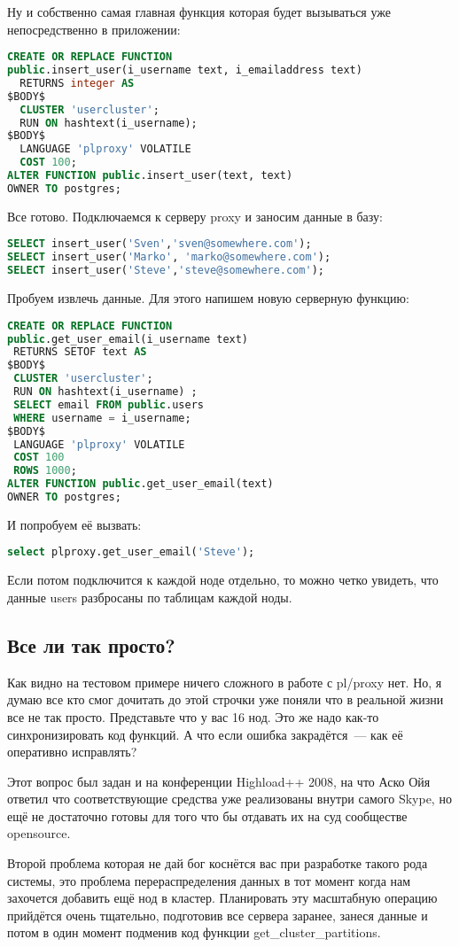 Ну и собственно самая главная функция которая будет вызываться уже непосредственно в приложении:
\begin{lstlisting}[language=SQL,label=lst:plproxy10,caption=Настройка]
CREATE OR REPLACE FUNCTION 
public.insert_user(i_username text, i_emailaddress text)
  RETURNS integer AS
$BODY$
  CLUSTER 'usercluster';
  RUN ON hashtext(i_username);
$BODY$
  LANGUAGE 'plproxy' VOLATILE
  COST 100;
ALTER FUNCTION public.insert_user(text, text) 
OWNER TO postgres;
\end{lstlisting}

Все готово. Подключаемся к серверу proxy и заносим данные в базу:
\begin{lstlisting}[language=SQL,label=lst:plproxy11,caption=Настройка]
SELECT insert_user('Sven','sven@somewhere.com');
SELECT insert_user('Marko', 'marko@somewhere.com');
SELECT insert_user('Steve','steve@somewhere.com');
\end{lstlisting}

Пробуем извлечь данные.
Для этого напишем новую серверную функцию: 
\begin{lstlisting}[language=SQL,label=lst:plproxy12,caption=Настройка]
CREATE OR REPLACE FUNCTION 
public.get_user_email(i_username text)
 RETURNS SETOF text AS
$BODY$
 CLUSTER 'usercluster';
 RUN ON hashtext(i_username) ;
 SELECT email FROM public.users 
 WHERE username = i_username;
$BODY$
 LANGUAGE 'plproxy' VOLATILE
 COST 100
 ROWS 1000;
ALTER FUNCTION public.get_user_email(text) 
OWNER TO postgres;
\end{lstlisting}

И попробуем её вызвать:
\begin{lstlisting}[language=SQL,label=lst:plproxy13,caption=Настройка]
select plproxy.get_user_email('Steve');
\end{lstlisting}

Если потом подключится к каждой ноде отдельно, то можно четко увидеть, что данные users разбросаны по таблицам каждой ноды.

\subsection{Все ли так просто?}
Как видно на тестовом примере ничего сложного в работе с pl/proxy нет. 
Но, я думаю все кто смог дочитать до этой строчки уже поняли что в реальной жизни все не так просто.
Представьте что у вас 16 нод. Это же надо как-то синхронизировать код функций. А что если ошибка закрадётся~--- 
как её оперативно исправлять?

Этот вопрос был задан и на конференции Highload++ 2008, на что Аско Ойя ответил что соответствующие средства 
уже реализованы внутри самого Skype, но ещё не достаточно готовы для того что бы отдавать их на суд сообществе opensource.

Второй проблема которая не дай бог коснётся вас при разработке такого рода системы, это проблема перераспределения данных 
в тот момент когда нам захочется добавить ещё нод в кластер.
Планировать эту масштабную операцию прийдётся очень тщательно, подготовив все сервера заранее, 
занеся данные и потом в один момент подменив код функции get\_cluster\_partitions.